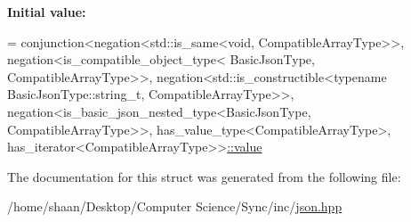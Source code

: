 {\bfseries Initial value\+:}
\begin{DoxyCode}
=
        conjunction<negation<std::is\_same<void, CompatibleArrayType>>,
        negation<is\_compatible\_object\_type<
        BasicJsonType, CompatibleArrayType>>,
        negation<std::is\_constructible<\textcolor{keyword}{typename} BasicJsonType::string\_t,
        CompatibleArrayType>>,
        negation<is\_basic\_json\_nested\_type<BasicJsonType, CompatibleArrayType>>,
        has\_value\_type<CompatibleArrayType>,
        has\_iterator<CompatibleArrayType>>\hyperlink{structnlohmann_1_1detail_1_1is__compatible__array__type_a01bc2274c22746bbb2cefd2acee8b572}{::value}
\end{DoxyCode}


The documentation for this struct was generated from the following file\+:\begin{DoxyCompactItemize}
\item 
/home/shaan/\+Desktop/\+Computer Science/\+Sync/inc/\hyperlink{json_8hpp}{json.\+hpp}\end{DoxyCompactItemize}
